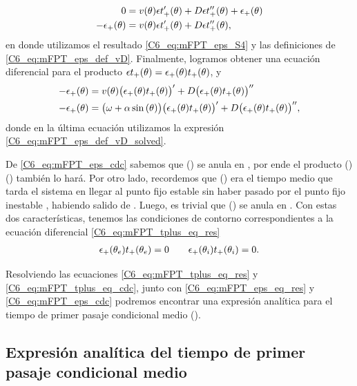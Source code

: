 \documentclass[./main.tex]{subfiles}
\begin{document}
\begin{align}
       0 &= v(\theta) \epsilon t_+'(\theta)  + D \epsilon t_+''(\theta) + \epsilon_{+}(\theta) \nonumber\\
       -\epsilon_{+}(\theta) &= v(\theta) \epsilon t_+'(\theta)  + D \epsilon t_+''(\theta),
\end{align}
en donde utilizamos el resultado \ref{C6_eq:mFPT_eps_S4} y las definiciones de \ref{C6_eq:mFPT_eps_def_vD}.
Finalmente, logramos obtener una ecuación diferencial para el producto $\epsilon t_+(\theta) = \epsilon_{+}(\theta) t_{+}(\theta)$, y
\begin{align}
       - \epsilon_{+}(\theta) &= v(\theta) \big(\epsilon_{+}(\theta) t_{+}(\theta)\big)'  + D  \big(\epsilon_{+}(\theta) t_{+}(\theta)\big)''  \\
     - \epsilon_{+}(\theta) &= \big(\omega + \alpha \sin{(\ensuremath{\theta})}\big) \big(\epsilon_{+}(\theta) t_{+}(\theta)\big)'  + D \big(\epsilon_{+}(\theta) t_{+}(\theta)\big)'' ,
       \label{C6_eq:mFPT_tplus_eq_res}
\end{align}
donde en la última ecuación utilizamos la expresión  \ref{C6_eq:mFPT_eps_def_vD_solved}.

De \ref{C6_eq:mFPT_eps_cdc} sabemos que \epsplus(\xx) se anula en \xxi, por ende el producto \epsplus(\xx) \tplus(\xx) también lo hará. Por otro lado, recordemos que \tplus(\xx) era el tiempo medio que tarda el sistema en llegar al punto fijo estable \xxe sin haber pasado por el punto fijo inestable \xxi, habiendo salido de \xx. Luego, es trivial que \tplus(\xx) se anula en \xxe. Con estas dos características, tenemos las condiciones de contorno correspondientes a la ecuación diferencial \ref{C6_eq:mFPT_tplus_eq_res}
\begin{align}
    \epsilon_{+}(\theta_e) t_{+}(\theta_e) = 0 \qquad \epsilon_{+}(\theta_i) t_{+}(\theta_i) = 0 .
    \label{C6_eq:mFPT_tplus_eq_cdc}
\end{align}

Resolviendo las ecuaciones \ref{C6_eq:mFPT_tplus_eq_res} y \ref{C6_eq:mFPT_tplus_eq_cdc}, junto con \ref{C6_eq:mFPT_eps_eq_res} y \ref{C6_eq:mFPT_eps_cdc} podremos encontrar una expresión analítica para el tiempo de primer pasaje condicional medio \tplus(\xx). 


\subsection{Expresión analítica del tiempo de primer pasaje condicional medio}
\end{document}
